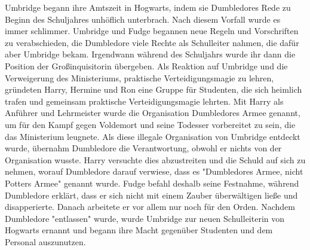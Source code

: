 \documentclass[a4paper, 10pt]{article}
\begin{document}
\vspace{10pt}
\newline
{}  
Umbridge begann ihre Amtszeit in Hogwarts, indem sie Dumbledores Rede zu Beginn des Schuljahres unhöflich unterbrach. Nach diesem Vorfall wurde es immer schlimmer. Umbridge und Fudge begannen neue Regeln und Vorschriften zu verabschieden, die Dumbledore viele Rechte als Schulleiter nahmen, die dafür aber Umbridge bekam. Irgendwann während des Schuljahrs wurde ihr dann die Position der Großinquisitorin übergeben. Als Reaktion auf Umbridge und die Verweigerung des Ministeriums, praktische Verteidigungsmagie zu lehren, gründeten Harry, Hermine und Ron eine Gruppe für Studenten, die sich heimlich trafen und gemeinsam praktische Verteidigungsmagie lehrten. Mit Harry als Anführer und Lehrmeister wurde die Organisation Dumbledores Armee genannt, um für den Kampf gegen Voldemort und seine Todesser vorbereitet zu sein, die das Ministerium leugnete.
\vspace{10pt}
\newline
{}  
Als diese illegale Organisation von Umbridge entdeckt wurde, übernahm Dumbledore die Verantwortung, obwohl er nichts von der Organisation wusste. Harry versuchte dies abzustreiten und die Schuld auf sich zu nehmen, worauf Dumbledore darauf verwiese, dass es "Dumbledores Armee, nicht Potters Armee" genannt wurde. Fudge befahl deshalb seine Festnahme, während Dumbledore erklärt, dass er sich nicht mit einem Zauber überwältigen ließe und disapperierte. Danach arbeitete er vor allem nur noch für den Orden. Nachdem Dumbledore "entlassen" wurde, wurde Umbridge zur neuen Schulleiterin von Hogwarts ernannt und begann ihre Macht gegenüber Studenten und dem Personal auszunutzen.
\end{document}
